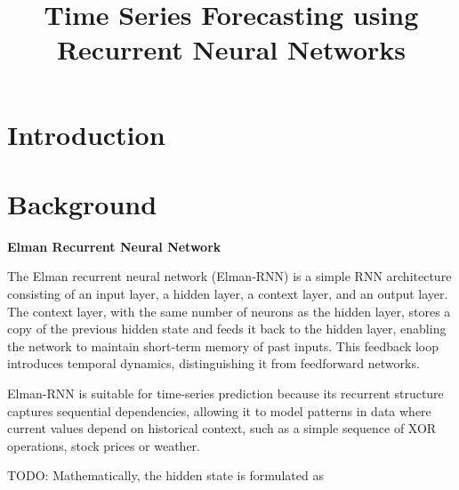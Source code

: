 \documentclass[conference, 10pt]{IEEEtran}
\begin{document}
\title{Time Series Forecasting using Recurrent Neural Networks}

\author{
}

\maketitle

\begin{abstract}

\end{abstract}

\begin{IEEEkeywords}

\end{IEEEkeywords}

\section{Introduction}



\section{Background}

\textbf{Elman Recurrent Neural Network }

The Elman recurrent neural network (Elman-RNN) is a simple RNN architecture consisting of an input layer, a hidden
layer, a context layer, and an output layer. The context layer, with the same number of neurons as the hidden layer,
stores a copy of the previous hidden state and feeds it back to the hidden layer, enabling the network to maintain
short-term memory of past inputs. This feedback loop introduces temporal dynamics, distinguishing it from feedforward
networks.

Elman-RNN is suitable for time-series prediction because its recurrent structure captures sequential dependencies,
allowing it to model patterns in data where current values depend on historical context, such as a simple sequence of
XOR operations, stock prices or weather.

TODO: Mathematically, the hidden state is formulated as 
\end{document}
